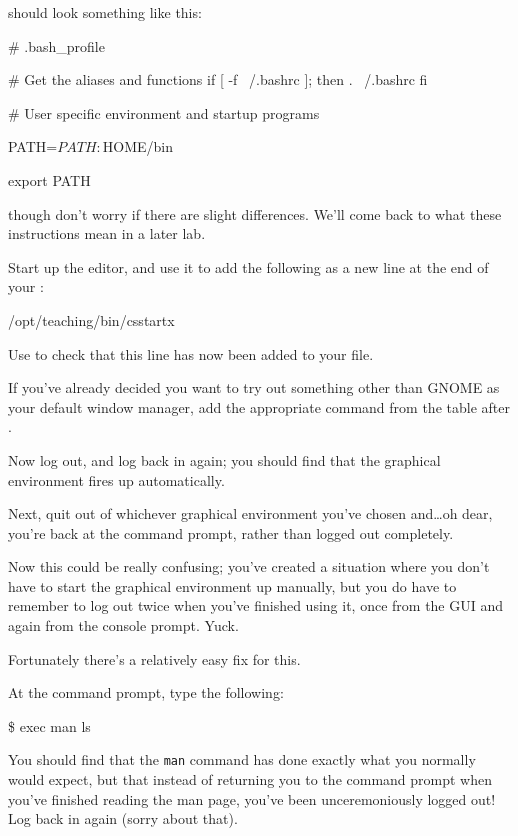  should look something like this:

\begin{ttoutenv}
# .bash_profile

# Get the aliases and functions
if [ -f ~/.bashrc ]; then
	. ~/.bashrc
fi

# User specific environment and startup programs

PATH=$PATH:$HOME/bin

export PATH
\end{ttoutenv}

though don't worry if there are slight differences. We'll come back to what these instructions mean in a later lab.

Start up the  editor, and use it to add the following as a  new line at the end of your :

\begin{ttoutenv}
/opt/teaching/bin/csstartx
\end{ttoutenv}

Use  to check that this line has now been added to your file.

If you've already decided you want to try out something other than GNOME as your default window manager, add the appropriate command from the table after . 

Now log out, and log back in again; you should find that the graphical environment fires up automatically. 

Next, quit out of whichever graphical environment you've chosen and\ldots oh dear, you're back at the  command prompt, rather than logged out completely. 

Now this could be really confusing; you've created a situation where you don't have to start the graphical environment up manually, but you do have to remember to log out twice when you've finished using it, once from the GUI and again from the console prompt. Yuck.

Fortunately there's a relatively easy fix for this.

At the  command prompt, type the following:

\begin{ttoutenv}
\$ exec man ls
\end{ttoutenv}

You should find that the \texttt{man} command has done exactly what you normally would expect, but that instead of returning you to the command prompt when you've finished reading the man page, you've been unceremoniously logged out! Log back in again (sorry about that). 

